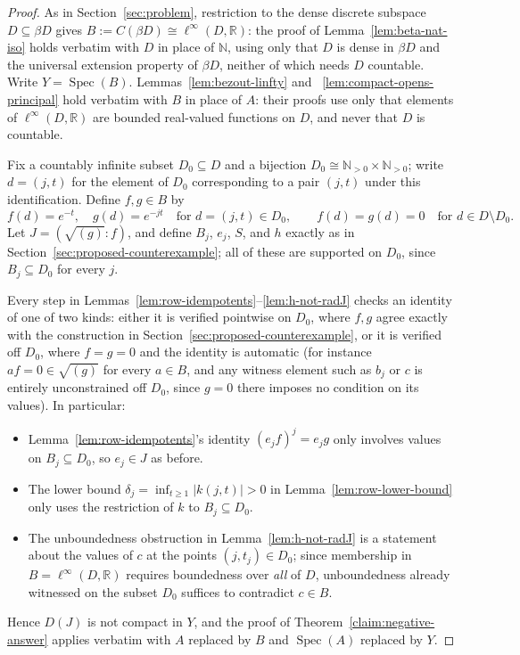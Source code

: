 \documentclass{amsart}
\theoremstyle{definition}
\theoremstyle{remark}
\newcommand{\Spec}[1]{\operatorname{Spec}\left(#1\right)}
\newcommand{\nat}{\mathbb N}
\newcommand{\reals}{\mathbb R}
\newcommand{\cont}[1]{C\left(#1\right)}
\newcommand{\linfty}{\ell^\infty}
\begin{document}
\begin{proof}
As in Section~\ref{sec:problem}, restriction to the dense discrete
subspace $D\subseteq\beta D$ gives
$B:=\cont{\beta D}\cong\linfty(D,\reals)$: the proof of
Lemma~\ref{lem:beta-nat-iso} holds verbatim with $D$ in place of $\nat$,
using only that $D$ is dense in $\beta D$ and the universal extension
property of $\beta D$, neither of which needs $D$ countable. Write
$Y=\Spec B$. Lemmas~\ref{lem:bezout-linfty} and
~\ref{lem:compact-opens-principal} hold verbatim with $B$ in place of
$A$: their proofs use only that elements of $\linfty(D,\reals)$ are
bounded real-valued functions on $D$, and never that $D$ is countable.

Fix a countably infinite subset $D_0\subseteq D$ and a bijection
$D_0\cong\nat_{>0}\times\nat_{>0}$; write $d=(j,t)$ for the element of
$D_0$ corresponding to a pair $(j,t)$ under this identification. Define
$f,g\in B$ by
\[
f(d)=e^{-t},
\quad
g(d)=e^{-jt}
\quad\text{for }d=(j,t)\in D_0,
\qquad
f(d)=g(d)=0
\quad\text{for }d\in D\setminus D_0.
\]
Let $J=(\sqrt{(g)}:f)$, and define $B_j$, $e_j$, $S$, and $h$ exactly as
in Section~\ref{sec:proposed-counterexample}; all of these are supported
on $D_0$, since $B_j\subseteq D_0$ for every $j$.

Every step in Lemmas~\ref{lem:row-idempotents}--\ref{lem:h-not-radJ}
checks an identity of one of two kinds: either it is verified pointwise
on $D_0$, where $f,g$ agree exactly with the construction in
Section~\ref{sec:proposed-counterexample}, or it is verified off $D_0$,
where $f=g=0$ and the identity is automatic (for instance $af=0\in
\sqrt{(g)}$ for every $a\in B$, and any witness element such as $b_j$ or
$c$ is entirely unconstrained off $D_0$, since $g=0$ there imposes no
condition on its values). In particular:
\begin{itemize}
\item Lemma~\ref{lem:row-idempotents}'s identity $(e_jf)^j=e_jg$ only
involves values on $B_j\subseteq D_0$, so $e_j\in J$ as before.
\item The lower bound $\delta_j=\inf_{t\ge1}|k(j,t)|>0$ in
Lemma~\ref{lem:row-lower-bound} only uses the restriction of $k$ to
$B_j\subseteq D_0$.
\item The unboundedness obstruction in Lemma~\ref{lem:h-not-radJ} is a
statement about the values of $c$ at the points $(j,t_j)\in D_0$; since
membership in $B=\linfty(D,\reals)$ requires boundedness over \emph{all}
of $D$, unboundedness already witnessed on the subset $D_0$ suffices to
contradict $c\in B$.
\end{itemize}
Hence $D(J)$ is not compact in $Y$, and the proof of
Theorem~\ref{claim:negative-answer} applies verbatim with $A$ replaced by
$B$ and $\Spec A$ replaced by $Y$.
\end{proof}
\end{document}
